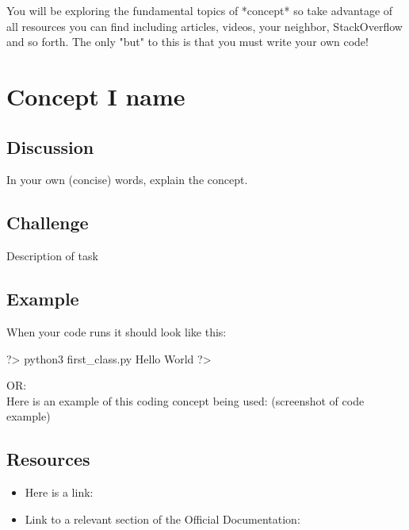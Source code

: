 \documentclass{42-en}
\begin{document}
	You will be exploring the fundamental topics of *concept*
	so take advantage of all resources you can find including articles, videos, 
	your neighbor, StackOverflow and so forth. The only "but" to this is that you
	must write your own code!

\startexercices

\chapter{Concept I name}

\section{Discussion}

In your own (concise) words, explain the concept.

\section{Challenge}


\makeheaderfiles
Description of task\\

\section{Example}
When your code runs it should look like this: 

\begin{42console}
	?> python3 first_class.py
	Hello World
	?>
\end{42console}

OR:\\

Here is an example of this coding concept being used: (screenshot of code example)


\section{Resources}
\begin{itemize}
	\item Here is a link:
    \item Link to a relevant section of the Official Documentation:
\end{itemize}
\end{document}
